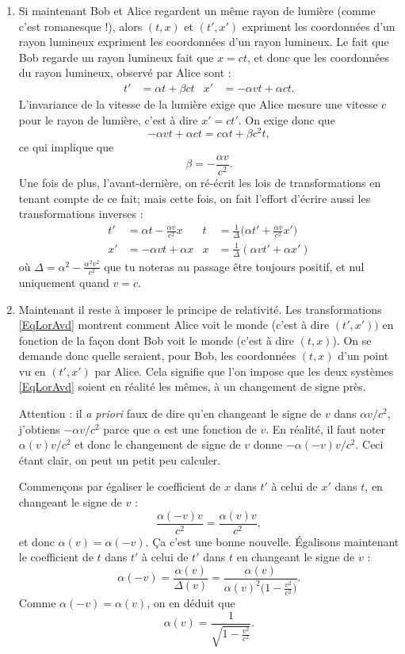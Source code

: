 \begin{enumerate}
\item Si maintenant Bob et Alice regardent un même rayon de lumière (comme c'est romanesque !), alors $(t,x)$ et $(t',x')$ expriment les coordonnées d'un rayon lumineux expriment les coordonnées d'un rayon lumineux. Le fait que Bob regarde un rayon lumineux fait que $x=ct$, et donc que les coordonnées du rayon lumineux, observé par Alice sont :
\begin{align}
   t'&=\alpha t+\beta ct	&x'&=-\alpha v t+\alpha c t.
\end{align}
L'invariance de la vitesse de la lumière exige que Alice mesure une vitesse $c$ pour le rayon de lumière, c'est à dire $x'=ct'$. On exige donc que
\[ 
  -\alpha v t+\alpha ct=c\alpha t+\beta c^2t,
\]
ce qui implique que 
\[ 
  \beta=-\frac{ \alpha v }{ c^2 }.
\]
Une fois de plus, l'avant-dernière,  on ré-écrit les lois de transformations en tenant compte de ce fait; mais cette fois, on fait l'effort d'écrire aussi les transformations inverses :
\begin{align}	\label{EqLorAvd}
t'&=\alpha t-\frac{ \alpha v }{ c^2 }x		& t&=\frac{1}{ \Delta }\big( \alpha t'+\frac{ \alpha v }{ c^2 }x' \big)\\
x'&=-\alpha vt+\alpha x				& x&=\frac{1}{ \Delta }(\alpha v t'+\alpha x')
\end{align}
où $\Delta=\alpha^2-\frac{ \alpha^2 v^2 }{ c^2 }$ que tu noteras au passage être toujours positif, et nul uniquement quand $v=c$.

\item Maintenant il reste à imposer le principe de relativité. Les transformations \eqref{EqLorAvd} montrent comment Alice voit le monde (c'est à dire $(t',x'))$ en fonction de la façon dont Bob voit le monde (c'est à dire $(t,x)$). On se demande donc quelle seraient, pour Bob, les coordonnées $(t,x)$ d'un point vu en $(t',x')$ par Alice. Cela signifie que l'on impose que les deux systèmes \eqref{EqLorAvd} soient en réalité les mêmes, à un changement de signe près.

Attention : il \emph{a priori} faux de dire qu'en changeant le signe de $v$ dans $\alpha v/c^2$, j'obtiens $-\alpha v/c^2$ parce que $\alpha$ est une fonction de $v$. En réalité, il faut noter $\alpha(v)v/c^2$ et donc le changement de signe de $v$ donne $-\alpha(-v)v/c^2$. Ceci étant clair, on peut un petit peu calculer.

Commençons par égaliser le coefficient de $x$ dans $t'$ à celui de $x'$ dans $t$, en changeant le signe de $v$ :
\[ 
  \frac{ \alpha(-v)v }{ c^2 }=\frac{ \alpha(v)v }{ c^2 },
\]
 et donc $\alpha(v)=\alpha(-v)$. Ça c'est une bonne nouvelle. Égalisons maintenant le coefficient de $t$ dans $t'$ à celui de $t'$ dans $t$ en changeant le signe de $v$ :
\[ 
  \alpha(-v)=\frac{ \alpha(v) }{ \Delta(v) }=\frac{ \alpha(v) }{ \alpha(v)^2\big( 1-\frac{ v^2 }{ c^2 } \big) }.
\]
Comme $\alpha(-v)=\alpha(v)$, on en déduit que
\begin{equation}		\label{EqalphaLo}
\alpha(v)=\frac{1}{ \sqrt{1-\frac{ v^2 }{ c^2 }} }.
\end{equation}
\end{enumerate}

